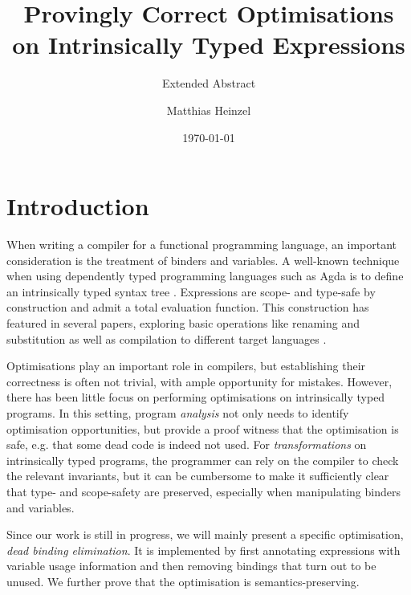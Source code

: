 \documentclass[sigplan,nonacm,screen]{acmart}
\title{Provingly Correct Optimisations on Intrinsically Typed Expressions}
\subtitle{Extended Abstract}
\author{Matthias Heinzel}
\affiliation{%
  \institution{Utrecht University}
  \city{Utrecht}
  \country{Netherlands}}
\date{\today}
\begin{document}
\maketitle

\section{Introduction}

When writing a compiler for a functional programming language,
an important consideration is the treatment of binders and variables.
A well-known technique when using dependently typed programming languages such as Agda
\cite{norell2007agda}
is to define an intrinsically typed syntax tree \cite{augustsson1999intrinsic}.
Expressions are scope- and type-safe by construction and admit a total evaluation function.
This construction has featured in several papers, exploring
basic operations like renaming and substitution
\cite{allais2018universe}
as well as compilation to different target languages
\cite[supplemental material]{pickard2021calculating}.

Optimisations play an important role in compilers, but
establishing their correctness is often not trivial,
with ample opportunity for mistakes.
However, there has been little focus on performing optimisations on intrinsically typed programs.
%
In this setting, program \emph{analysis} not only needs to identify optimisation opportunities,
but provide a proof witness that the optimisation is safe,
e.g. that some dead code is indeed not used.
For \emph{transformations} on intrinsically typed programs,
the programmer can rely on the compiler to check the relevant invariants,
but it can be cumbersome to make it sufficiently clear that type- and scope-safety are preserved,
especially when manipulating binders and variables.



Since our work is still in progress,
we will mainly present a specific optimisation, \emph{dead binding elimination}.
It is implemented by first annotating expressions with variable usage information
and then removing bindings that turn out to be unused.
We further prove that the optimisation is semantics-preserving.
\end{document}

